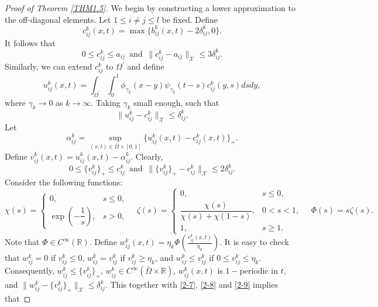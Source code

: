 \documentclass[11pt,reqno]{amsart}
\numberwithin{equation}{section}
\begin{document}
\begin{proof}[Proof of Theorem \ref{THM1.5}]
We begin by constructing a lower approximation to the off-diagonal elements. Let $1\leq i\neq j\leq l$ be fixed.
Define
\begin{equation*}
c_{ij}^{k}(x,t) = \max \{ b_{ij}^{k}(x,t) - 2\delta_{ij}^{k} , 0 \}.
\end{equation*}
It follows that
\begin{equation}\label{2-7}
0 \leq c_{ij}^{k} \leq a_{ij}
\enspace\text{and}\enspace
\| c_{ij}^{k} - a_{ij} \|_{\mathcal{X}} \leq 3\delta^{k}_{ij}.
\end{equation}
Similarly, we can extend $c_{ij}^{k}$ to $\Omega^{\prime}$ and define
\begin{equation*}
u^{k}_{ij}(x,t) = \int_{\Omega^{\prime}}\int_{0}^{1}
\phi_{\gamma_{k}}(x-y)\psi_{\gamma_{k}}(t-s) c^{k}_{ij}(y,s)dsdy,
\end{equation*}
where $\gamma_{k} \to 0$ as $k\to\infty$. Taking $\gamma_{k}$ small enough, such that
\begin{equation}\label{2-8}
\| u^{k}_{ij} - c_{ij}^{k} \|_{\mathcal{X}} \leq \delta_{ij}^{k}.
\end{equation}
Let
\begin{equation*}
\alpha^{k}_{ij} = \sup_{(x,t)\in\bar{\Omega}\times [0,1]} \{ u^{k}_{ij}(x,t) - c^{k}_{ij}(x,t)  \}_{+}.
\end{equation*}
Define $v^{k}_{ij}(x,t) =  u_{ij}^{k}(x,t) - \alpha^{k}_{ij} $. Clearly,
\begin{equation}\label{2-9}
0\leq \{v^{k}_{ij}\}_{+} \leq c_{ij}^{k}
\enspace \text{and} \enspace
\| \{v^{k}_{ij}\}_{+} - c_{ij}^{k} \|_{\mathcal{X}} \leq 2\delta_{ij}^{k}.
\end{equation}
Consider the following functions:
\begin{equation*}
\chi(s) =
\begin{cases}
0, & s \leq 0, \\
\exp \left( -\dfrac{1}{s} \right), & s > 0,
\end{cases}
\quad
\zeta(s) =
\begin{cases}
0, & s \leq 0, \\
\dfrac{\chi(s)}{\chi(s) + \chi(1-s)}, & 0 < s < 1, \\
1, & s \geq 1.
\end{cases}
\quad
\Phi(s) = s\zeta(s).
\end{equation*}
Note that $\Phi\in C^{\infty}(\mathbb{R})$.
Define $w_{ij}^{k}(x,t) = \eta_{k}\Phi\left( \frac{v_{ij}^{k}(x,t)}{\eta_{k}} \right)$. It is easy to check that
$w_{ij}^{k} =0 $ if $v_{ij}^{k} \leq 0$, $w_{ij}^{k} = v_{ij}^{k}$ if $v_{ij}^{k} \geq \eta_{k}$, and $w_{ij}^{k} \leq v_{ij}^{k}$ if $0\leq v_{ij}^{k} \leq \eta_{k}$. Consequently, $w_{ij}^{k} \leq \{v_{ij}^{k}\}_{+}$, $w_{ij}^{k} \in C^{\infty}(\bar{\Omega}\times \mathbb{R})$, $w_{ij}^{k}(x,t)$ is $1-$periodic in $t$, and $\| w_{ij}^{k} - \{v_{ij}^{k}\}_{+}\|_{\mathcal{X}} \leq \delta_{ij}^{k}$. This together with \eqref{2-7}, \eqref{2-8} and \eqref{2-9} implies that

\end{proof}
\end{document}

